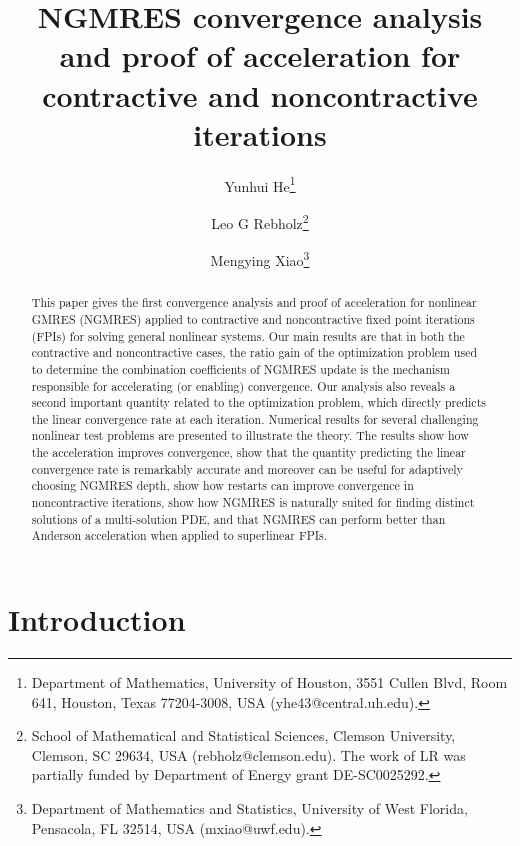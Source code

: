 \documentclass{article}
\title{NGMRES convergence analysis and proof of acceleration for contractive and noncontractive iterations}
\author{
Yunhui He\thanks{Department of Mathematics, University of Houston, 3551 Cullen Blvd, Room 641, Houston, Texas 77204-3008, USA (yhe43@central.uh.edu).}
\and 
Leo G Rebholz\thanks{School of Mathematical and Statistical Sciences, Clemson University, Clemson, SC 29634, USA (rebholz@clemson.edu).  The work of LR was partially funded by Department of Energy grant DE-SC0025292.}
\and 
Mengying Xiao\thanks{Department of Mathematics and Statistics, University of West Florida, Pensacola, FL 32514, USA (mxiao@uwf.edu).}
}
\numberwithin{equation}{section}
\begin{document}
\maketitle

\begin{abstract}
This paper gives the first convergence analysis and proof of acceleration for nonlinear GMRES (NGMRES) applied to contractive and noncontractive fixed point iterations (FPIs) for solving general nonlinear systems.  Our main results are that in both the contractive and noncontractive cases, the ratio gain of the optimization problem used to determine the combination coefficients of  NGMRES update is the mechanism responsible for accelerating (or enabling) convergence.  Our analysis also reveals a second important quantity related to the optimization problem, which directly predicts the linear convergence rate at each iteration.
Numerical results for several challenging nonlinear test problems are presented to  illustrate the theory. The results show how the acceleration improves convergence, show that the quantity predicting the linear convergence rate is remarkably accurate and moreover can be useful for adaptively choosing NGMRES depth, show how restarts can improve convergence in noncontractive iterations, show how NGMRES is naturally suited for finding distinct solutions of a multi-solution PDE, and that NGMRES can perform better than Anderson acceleration when applied to superlinear FPIs.
\end{abstract}



\section{Introduction}
\end{document}
